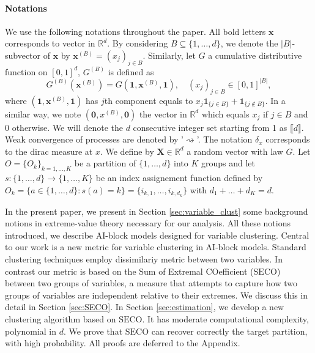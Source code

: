 \documentclass[11pt]{article}
\newcommand{\SECO}{\mathrm{SECO}}
\begin{document}
	\paragraph{Notations} We use the following notations throughout the paper. All bold letters $\textbf{x}$ corresponds to vector in $\mathbb{R}^d$. By considering $B \subseteq \{1,\dots,d\}$, we denote the $|B|$-subvector of $\textbf{x}$ by $\textbf{x}^{(B)} = (x_j)_{j \in B}$. Similarly, let $G$ a cumulative distributive function on $[0,1]^d$, $G^{(B)}$ is defined as
	\begin{equation*}
		G^{(B)}(\textbf{x}^{(B)}) = G(\textbf{1},\textbf{x}^{(B)}, \textbf{1}), \quad (x_j)_{j \in B} \in [0,1]^{|B|},
	\end{equation*}
	where $(\textbf{1},\textbf{x}^{(B)}, \textbf{1})$ has $j$th component equals to $x_j \mathds{1}_{\{j \in B\}} + \mathds{1}_{\{ j \notin B\}}$. In a similar way, we note $(\textbf{0}, x^{(B)}, \textbf{0})$ the vector in $\mathbb{R}^d$ which equals $x_j$ if $j \in B$ and $ 0 $ otherwise. We will denote the $d$ consecutive integer set starting from 1 as $\llbracket d \rrbracket$. Weak convergence of processes are denoted by '$\rightsquigarrow$'. The notation $\delta_x$ corresponds to the dirac measure at $x$. We define by $\textbf{X} \in \mathbb{R}^d$ a random vector with law $G$. Let $O = \{O_k\}_{k= 1 ,\dots, K}$ be a partition of $\{1,\dots,d\}$ into $K$ groups and let $s : \{1,\dots,d\} \rightarrow \{1,\dots,K\}$ be an index assignement function defined by $O_k = \{a \in \{1,\dots,d\} : s(a) = k\} = \{i_{k,1}, \dots, i_{k,d_k}\}$ with $d_1+\dots+d_K = d$.
	
	In the present paper, we present in Section \ref{sec:variable_clust} some background notions in extreme-value theory necessary for our analysis. All these notions introduced, we describe AI-block models designed for variable clustering. Central to our work is a new metric for variable clustering in AI-block models. Standard clustering techniques employ dissimilariy metric between two variables. In contrast our metric is based on the Sum of Extremal COefficient ($\SECO$) between two groups of variables, a measure that attempts to capture how two groups of variables are independent relative to their extremes. We discuss this in detail in Section \ref{sec:SECO}. In Section \ref{sec:estimation}, we develop a new clustering algorithm based on $\SECO$. It has moderate computational complexity, polynomial in $d$. We prove that $\SECO$ can recover correctly the target partition, with high probability. All proofs are deferred to the Appendix.
	
\end{document}
